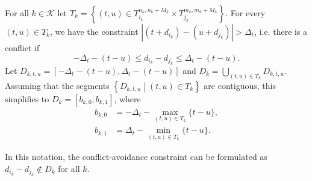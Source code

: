 \documentclass[twocolumn]{article}
\newcommand{\dmax}{d_{\max}}
\DeclareMathOperator*{\argmin}{arg\,min}
\begin{document}
For all $k \in \mathcal{K}$ let 
$T_k = 
\left\{(t, u) \in T_{i_k}^{n_k, n_k + M_k} \times T_{j_k}^{m_k, m_k + M_k} \right\}$.
For every $(t, u) \in T_k$, we have the constraint $|(t + d_{i_k}) - (u + d_{j_k})| > \Delta_t$, 
i.e.
there is a conflict if 
\begin{equation}
    - \Delta_t - (t - u) \leq d_{i_k} - d_{j_k} \leq \Delta_t - (t -u).
\end{equation}
Let 
$D_{k, t, u} = [- \Delta_t - (t -u), \Delta_t - (t -u)]$
and
$D_{k} = \bigcup_{(t, u) \in T_k} D_{k, t, u}$.
Assuming that the segments $\left\{D_{k, t, u} \middle| (t, u) \in T_k\right\}$ are contiguous, this simplifies to
$D_k = 
\left[b_{k, 0}, b_{k, 1}\right]$,
where
\begin{align}
b_{k, 0} &= -\Delta_t - \max_{(t, u) \in T_k} \{t -u\},\\
b_{k, 1} &= \Delta_t - \min_{(t, u) \in T_k} \{t -u\}.
\end{align}

In this notation, the conflict-avoidance constraint can be formulated as 
$d_{i_k} - d_{j_k} \notin D_k$ for all $k$.


%
\end{document}
